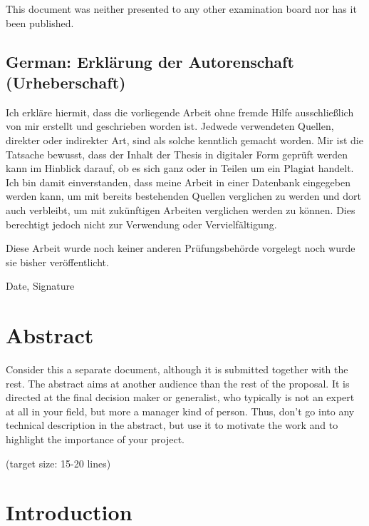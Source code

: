 \documentclass[a4paper,11pt,oneside]{article}
\begin{document}
  This document was neither presented to any other examination board
  nor has it been published.

  \subsection*{German: Erklärung der Autorenschaft (Urheberschaft)}

  Ich erkläre hiermit, dass die vorliegende Arbeit ohne fremde Hilfe
  ausschließlich von mir erstellt und geschrieben worden ist. Jedwede
  verwendeten Quellen, direkter oder indirekter Art, sind als solche
  kenntlich gemacht worden. Mir ist die Tatsache bewusst, dass der
  Inhalt der Thesis in digitaler Form geprüft werden kann im Hinblick
  darauf, ob es sich ganz oder in Teilen um ein Plagiat handelt. Ich
  bin damit einverstanden, dass meine Arbeit in einer Datenbank
  eingegeben werden kann, um mit bereits bestehenden Quellen
  verglichen zu werden und dort auch verbleibt, um mit zukünftigen
  Arbeiten verglichen werden zu können. Dies berechtigt jedoch nicht
  zur Verwendung oder Vervielfältigung.

  Diese Arbeit wurde noch keiner anderen Prüfungsbehörde vorgelegt
  noch wurde sie bisher veröffentlicht.

  \vspace{20mm}

  Date, Signature

  \newpage

  \section*{Abstract}

  Consider this a separate document, although it is submitted together
  with the rest. The abstract aims at another audience than the rest
  of the proposal. It is directed at the final decision maker or
  generalist, who typically is not an expert at all in your field, but
  more a manager kind of person. Thus, don't go into any technical
  description in the abstract, but use it to motivate the work and to
  highlight the importance of your project.

  (target size: 15-20 lines)

  \newpage
  \tableofcontents

  \clearpage

  \section{Introduction}
\end{document}
